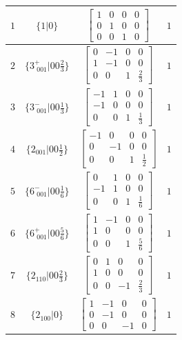 \documentclass[fleqn,8pt]{jsarticle}
\begin{document}
\begin{longtable}{cccc}
$ 1 $ & $ \{1|0\} $ & $ \begin{bmatrix} 1 & 0 & 0 & 0 \\ 0 & 1 & 0 & 0 \\ 0 & 0 & 1 & 0 \end{bmatrix} $ & $ 1 $ \\ \hline
$ 2 $ & $ \{3^{+}_{\,\,001}|0 0 \frac{2}{3}\} $ & $ \begin{bmatrix} 0 & -1 & 0 & 0 \\ 1 & -1 & 0 & 0 \\ 0 & 0 & 1 & \frac{2}{3} \end{bmatrix} $ & $ 1 $ \\ \hline
$ 3 $ & $ \{3^{-}_{\,\,001}|0 0 \frac{1}{3}\} $ & $ \begin{bmatrix} -1 & 1 & 0 & 0 \\ -1 & 0 & 0 & 0 \\ 0 & 0 & 1 & \frac{1}{3} \end{bmatrix} $ & $ 1 $ \\ \hline
$ 4 $ & $ \{2{}_{001}|0 0 \frac{1}{2}\} $ & $ \begin{bmatrix} -1 & 0 & 0 & 0 \\ 0 & -1 & 0 & 0 \\ 0 & 0 & 1 & \frac{1}{2} \end{bmatrix} $ & $ 1 $ \\ \hline
$ 5 $ & $ \{6^{-}_{\,\,001}|0 0 \frac{1}{6}\} $ & $ \begin{bmatrix} 0 & 1 & 0 & 0 \\ -1 & 1 & 0 & 0 \\ 0 & 0 & 1 & \frac{1}{6} \end{bmatrix} $ & $ 1 $ \\ \hline
$ 6 $ & $ \{6^{+}_{\,\,001}|0 0 \frac{5}{6}\} $ & $ \begin{bmatrix} 1 & -1 & 0 & 0 \\ 1 & 0 & 0 & 0 \\ 0 & 0 & 1 & \frac{5}{6} \end{bmatrix} $ & $ 1 $ \\ \hline
$ 7 $ & $ \{2{}_{110}|0 0 \frac{2}{3}\} $ & $ \begin{bmatrix} 0 & 1 & 0 & 0 \\ 1 & 0 & 0 & 0 \\ 0 & 0 & -1 & \frac{2}{3} \end{bmatrix} $ & $ 1 $ \\ \hline
$ 8 $ & $ \{2{}_{100}|0\} $ & $ \begin{bmatrix} 1 & -1 & 0 & 0 \\ 0 & -1 & 0 & 0 \\ 0 & 0 & -1 & 0 \end{bmatrix} $ & $ 1 $ \\ \hline

\end{longtable}
\end{document}
